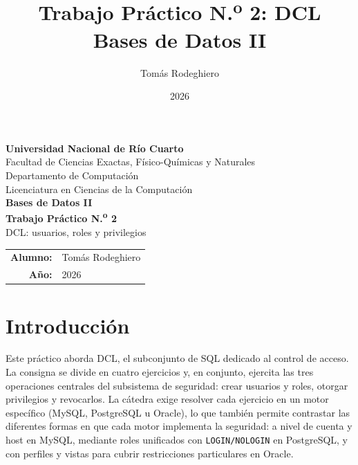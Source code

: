 \documentclass[11pt,a4paper]{article}
\title{Trabajo Práctico N.\textsuperscript{o} 2: DCL\\[4pt]
       \large Bases de Datos II}
\author{Tomás Rodeghiero}
\date{2026}
\begin{document}
\begin{titlepage}
    \centering
    \vspace*{1.5cm}

    {\large \textbf{Universidad Nacional de Río Cuarto}}\\[6pt]
    {\normalsize Facultad de Ciencias Exactas, Físico-Químicas y Naturales}\\[4pt]
    {\normalsize Departamento de Computación}\\[4pt]
    {\normalsize Licenciatura en Ciencias de la Computación}\\[3cm]

    {\Large \textbf{Bases de Datos II}}\\[1.2cm]

    {\Large \textbf{Trabajo Práctico N.\textsuperscript{o} 2}}\\[6pt]
    {\large DCL: usuarios, roles y privilegios}\\[3cm]

    \begin{tabular}{rl}
        \textbf{Alumno:} & Tomás Rodeghiero \\[4pt]
        \textbf{Año:}    & 2026 \\
    \end{tabular}

    \vfill
\end{titlepage}

\tableofcontents
\newpage

\section{Introducción}

Este práctico aborda DCL, el subconjunto de SQL dedicado al control de acceso. La consigna se divide en cuatro ejercicios y, en conjunto, ejercita las tres operaciones centrales del subsistema de seguridad: crear usuarios y roles, otorgar privilegios y revocarlos. La cátedra exige resolver cada ejercicio en un motor específico (MySQL, PostgreSQL u Oracle), lo que también permite contrastar las diferentes formas en que cada motor implementa la seguridad: a nivel de cuenta y host en MySQL, mediante roles unificados con \texttt{LOGIN/NOLOGIN} en PostgreSQL, y con perfiles y vistas para cubrir restricciones particulares en Oracle.
\end{document}

